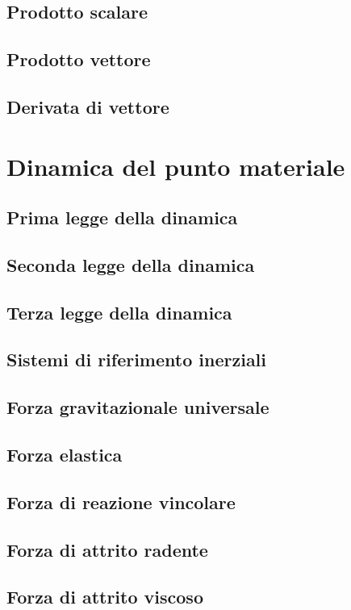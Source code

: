 \documentclass[a4paper]{article}
\begin{document}
\subsection{Prodotto scalare}
\subsection{Prodotto vettore}
\subsection{Derivata di vettore}

\newpage


\section{Dinamica del punto materiale}
\subsection{Prima legge della dinamica}
\subsection{Seconda legge della dinamica}
\subsection{Terza legge della dinamica}
\subsection{Sistemi di riferimento inerziali}
\subsection{Forza gravitazionale universale}
\subsection{Forza elastica}
\subsection{Forza di reazione vincolare}
\subsection{Forza di attrito radente}
\subsection{Forza di attrito viscoso}
\end{document}
